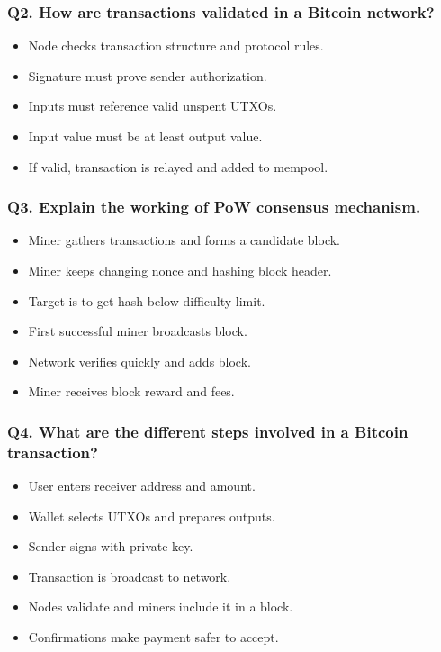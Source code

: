 \documentclass[12pt,a4paper]{article}
\begin{document}
\subsubsection*{Q2. How are transactions validated in a Bitcoin network?}
\begin{itemize}
\item Node checks transaction structure and protocol rules.
\item Signature must prove sender authorization.
\item Inputs must reference valid unspent UTXOs.
\item Input value must be at least output value.
\item If valid, transaction is relayed and added to mempool.
\end{itemize}

\subsubsection*{Q3. Explain the working of PoW consensus mechanism.}
\begin{itemize}
\item Miner gathers transactions and forms a candidate block.
\item Miner keeps changing nonce and hashing block header.
\item Target is to get hash below difficulty limit.
\item First successful miner broadcasts block.
\item Network verifies quickly and adds block.
\item Miner receives block reward and fees.
\end{itemize}

\subsubsection*{Q4. What are the different steps involved in a Bitcoin transaction?}
\begin{itemize}
\item User enters receiver address and amount.
\item Wallet selects UTXOs and prepares outputs.
\item Sender signs with private key.
\item Transaction is broadcast to network.
\item Nodes validate and miners include it in a block.
\item Confirmations make payment safer to accept.
\end{itemize}
\end{document}
